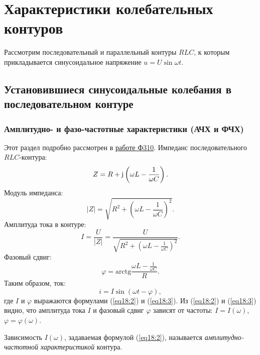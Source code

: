 \chapter{Характеристики колебательных контуров}
    Рассмотрим последовательный и параллельный контуры \( RLC \), к которым
    прикладывается синусоидальное напряжение \( u = U\sin\omega t \).
    
\section{Установившиеся синусоидальные колебания в последовательном контуре}
    \subsection{Амплитудно- и фазо-частотные характеристики (АЧХ и ФЧХ)}
        Этот раздел подробно рассмотрен в \href{http://google.com}{работе Ф310}.
        Импеданс последовательного \( RLC \)-контура:
        \begin{equation}
            Z = R + \mathrm{j}\left(\omega L - \frac{1}{\omega C}\right).
            \label{eq18:1}
        \end{equation}
        Модуль импеданса:
        \begin{equation}
            |Z| = \sqrt{R^2 + \left(\omega L - \frac{1}{\omega C}\right)^2}.
            \label{eq18:1a}
        \end{equation}
        Амплитуда тока в контуре:
        \begin{equation}
            I = \frac{U}{|Z|} = \frac{U}{\sqrt{R^2 + \left(\omega L -
            \frac{1}{\omega C}\right)^2}}.
            \label{eq18:2}
        \end{equation}
        Фазовый сдвиг:
        \begin{equation}
            \varphi = \mathrm{arctg}\frac{\omega L - \frac{1}{\omega C}}{R}.
            \label{eq18:3}
        \end{equation}
        Таким образом, ток:
        \[
            i = I\sin(\omega t - \varphi),
        \]
        где \( I \) и \( \varphi \) выражаются формулами (\ref{eq18:2}) и
        (\ref{eq18:3}). Из (\ref{eq18:2}) и (\ref{eq18:3}) видно, что амплитуда
        тока \( I \) и фазовый сдвиг \( \varphi \) зависят от частоты:
        \( I = I(\omega) \), \( \varphi = \varphi(\omega) \).
        
        \begin{definition}
            Зависимость \( I(\omega) \), задаваемая формулой (\ref{eq18:2}),
            называется \textit{амплитудно-частотной характеристикой} контура.
        \end{definition}
        
